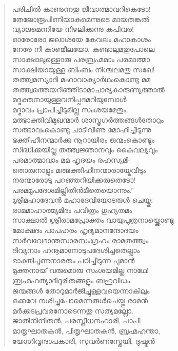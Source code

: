 \begin{verse}
പരിചില്‍ കാണുന്നതു ജീവാത്മാവറികെടോ!\\
തേജോരൂപിണിയാകുമെന്നുടെ മായതങ്കല്‍\\
വ്യാജമെന്നിയേ നിഴലിക്കുന്നു കപിവര!\\
ഓരോരോ ജലാശയേ കേവലം മഹാകാശം\\
നേരേ നീ കാണ്മീലയോ, കണ്ടാലുമതുപോലെ\\
സാക്ഷാലുള്ളൊരു പരബ്രഹ്മമാം പരമാത്മാ\\
സാക്ഷിയായുള്ള ബിംബം നിശ്ചലമതു സഖേ!\\
തത്ത്വമസ്യാദി മഹാവാക്യാര്‍ഥംകൊണ്ടു മമ\\
തത്ത്വത്തെയറിഞ്ഞിടാമാചാര്യകാരുണ്യത്താല്‍\\
മദ്ഭക്തനായുള്ളവനിപ്പദമറിയുമ്പോള്‍\\
മദ്ഭാവം പ്രാപിച്ചീടുമില്ല സംശയമേതും.\\
മത്ഭാക്തിവിമുഖന്മാര്‍ ശാസ്ത്രഗര്‍ത്തങ്ങള്‍തോറും\\
സത്ഭാവംകൊണ്ടു ചാടിവീണു മോഹിച്ചീടുന്നു\\
ഭക്തിഹീനന്മാര്‍ക്കു നൂറായിരം ജന്മംകൊണ്ടും\\
സിദ്ധിക്കയില്ല തത്ത്വജ്ഞാനവും കൈവല്യവും\\
പരമാത്മാവാം മമ ഹൃദയം രഹസ്യമി-\\
തൊരുനാളും മത്ഭക്തിഹീനന്മാരായ്മേവീടും\\
നരന്മാരോടു പറഞ്ഞറിയിക്കരുതെടോ!\\
പരമമുപദേശമില്ലിതിന്‍മീതെയൊന്നും.”\\
ശ്രീമഹാദേവന്‍ മഹാദേവിയോടരുള്‍ ചെയ്തു:\\
രാമമാഹാത്മ്യമിദം പവിത്രം ഗുഹ്യതമം\\
സാക്ഷാല്‍ ശ്രീരാമപ്രോക്തം \hbox{വായുപുത്രനായ്ക്കൊണ്ടു}\\
മോക്ഷദം പാപഹരം ഹൃദ്യമാനന്ദോദയം\\
സര്‍വവേദാന്തസാരസംഗ്രഹം രാമതത്ത്വം\\
ദിവ്യനാം ഹനൂമാനോടുപദേശിച്ചതെല്ലാം\\
ഭാക്തിപൂണ്ടനാരതം പഠിച്ചീടുന്ന പുമാന്‍\\
മുക്തനായ് വരുമൊരു സംശയമില്ല നാഥേ!\\
ബ്രഹ്മഹത്യാദിദുരിതങ്ങളും ബഹുവിധം\\
ജന്മങ്ങള്‍ തോറുമാര്‍ജിച്ചുള്ളവയെന്നാകിലും\\
ഒക്കവേ നശിച്ചുപോമെന്നരുള്‍ചെയ്തു രാമന്‍\\
മര്‍ക്കടപ്രവരനോടെന്നതു സത്യമല്ലോ.\\
ജാതിനിന്ദിതന്‍, പരസ്ത്രീധനഹാരി, പാപി\\
മാതൃഘാതകന്‍, പിതൃഘാതകന്‍, ബ്രഹ്മഹന്താ,\\
യോഗിവൃന്ദാപകാരി, സുവര്‍ണസ്തേയി, ദുഷ്ടന്‍\\

\end{verse}
